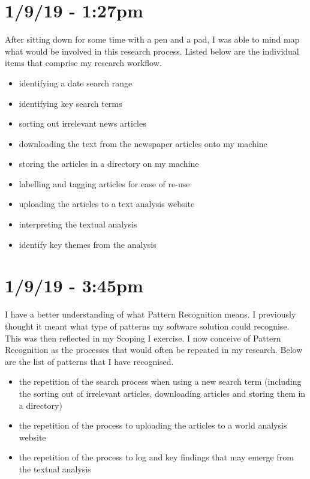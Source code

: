 \documentclass{article}
\begin{document}
\section*{1/9/19 - 1:27pm}

After sitting down for some time with a pen and a pad, I was able to mind map what would be involved in this research process. Listed below are the individual items that comprise my research workflow.

\begin{itemize}
    \item identifying a date search range
    \item identifying key search terms
    \item sorting out irrelevant news articles
    \item downloading the text from the newspaper articles onto my machine
    \item storing the articles in a directory on my machine
    \item labelling and tagging articles for ease of re-use
    \item uploading the articles to a text analysis website
    \item interpreting the textual analysis
    \item identify key themes from the analysis
\end{itemize}

\section*{1/9/19 - 3:45pm}

I have a better understanding of what Pattern Recognition means. I previously thought it meant what type of patterns my software solution could recognise. This was then reflected in my Scoping I exercise. I now conceive of Pattern Recognition as the processes that would often be repeated in my research. Below are the list of patterns that I have recognised.

\begin{itemize}
    \item the repetition of the search process when using a new search term (including the sorting out of irrelevant articles, downloading articles and storing them in a directory)
    \item the repetition of the process to uploading the articles to a world analysis website
    \item the repetition of the process to log and key findings that may emerge from the textual analysis
\end{itemize}
\end{document}
